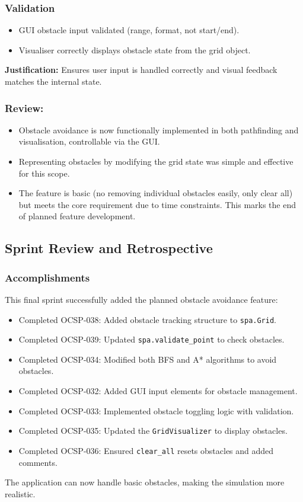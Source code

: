 \subsubsection{Validation}
\begin{itemize}
	\item GUI obstacle input validated (range, format, not start/end).
	\item Visualiser correctly displays obstacle state from the grid object.
\end{itemize}
\textbf{Justification:} Ensures user input is handled correctly and visual feedback matches the internal state.

\subsubsection{Review:}
\begin{itemize}
	\item Obstacle avoidance is now functionally implemented in both pathfinding and visualisation, controllable via the GUI.
	\item Representing obstacles by modifying the grid state was simple and effective for this scope.
	\item The feature is basic (no removing individual obstacles easily, only clear all) but meets the core requirement due to time constraints. This marks the end of planned feature development.
\end{itemize}

\clearpage
\subsection{Sprint Review and Retrospective}

\subsubsection{Accomplishments}
This final sprint successfully added the planned obstacle avoidance feature:
\begin{itemize}
    \item Completed OCSP-038: Added obstacle tracking structure to \verb|spa.Grid|.
    \item Completed OCSP-039: Updated \verb|spa.validate_point| to check obstacles.
	\item Completed OCSP-034: Modified both BFS and A* algorithms to avoid obstacles.
	\item Completed OCSP-032: Added GUI input elements for obstacle management.
	\item Completed OCSP-033: Implemented obstacle toggling logic with validation.
	\item Completed OCSP-035: Updated the \verb|GridVisualizer| to display obstacles.
	\item Completed OCSP-036: Ensured \verb|clear_all| resets obstacles and added comments.
\end{itemize}
The application can now handle basic obstacles, making the simulation more realistic.

